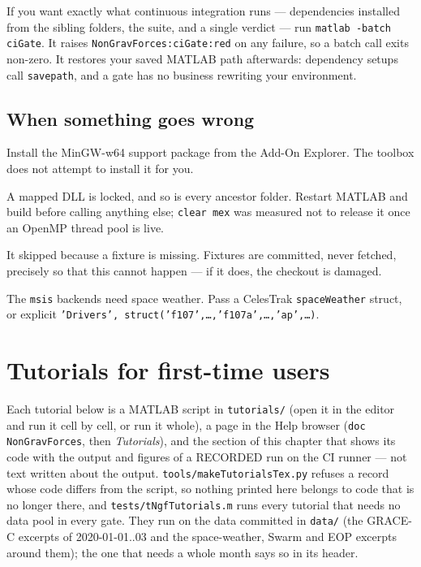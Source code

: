 \documentclass[11pt,a4paper]{report}
\begin{document}
\noindent If you want exactly what continuous integration runs --- dependencies installed from the
sibling folders, the suite, and a single verdict --- run \texttt{matlab -batch ciGate}. It raises
\texttt{NonGravForces:ciGate:red} on any failure, so a batch call exits non-zero. It restores your
saved MATLAB path afterwards: dependency setups call \texttt{savepath}, and a gate has no business
rewriting your environment.

\section{When something goes wrong}
\begin{description}[leftmargin=1.4em,style=nextline]
\item[\texttt{buildMex} says it cannot find a compiler.] Install the MinGW-w64 support package from
 the Add-On Explorer. The toolbox does not attempt to install it for you.
\item[A MEX file cannot be overwritten on Windows.] A mapped DLL is locked, and so is every ancestor
 folder. Restart MATLAB and build before calling anything else; \texttt{clear mex} was measured not
 to release it once an OpenMP thread pool is live.
\item[A test is \emph{incomplete} rather than failing.] It skipped because a fixture is missing.
 Fixtures are committed, never fetched, precisely so that this cannot happen --- if it does, the
 checkout is damaged.
\item[\texttt{density} refuses with \texttt{inputDrivers}.] The \texttt{msis} backends need space
 weather. Pass a CelesTrak \texttt{spaceWeather} struct, or explicit
 \texttt{'Drivers', struct('f107',\ldots,'f107a',\ldots,'ap',\ldots)}.
\end{description}


\chapter*{Tutorials for first-time users}
Each tutorial below is a MATLAB script in \texttt{tutorials/} (open it in the editor and run it cell by
cell, or run it whole), a page in the Help browser (\texttt{doc NonGravForces}, then \emph{Tutorials}),
and the section of this chapter that shows its code with the output and figures of a RECORDED run on the
CI runner --- not text written about the output. \texttt{tools/makeTutorialsTex.py} refuses a record
whose code differs from the script, so nothing printed here belongs to code that is no longer there,
and \texttt{tests/tNgfTutorials.m} runs every tutorial that needs no data pool in every gate. They run
on the data committed in \texttt{data/} (the GRACE-C excerpts of 2020-01-01..03 and the space-weather,
Swarm and EOP excerpts around them); the one that needs a whole month says so in its header.
\end{document}
